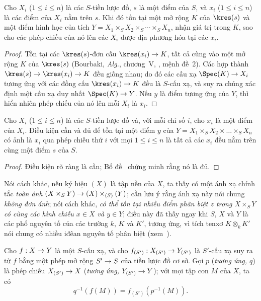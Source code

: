 \documentclass[oneside]{amsart}
\makeatletter
\renewcommand{\leq}{\leqslant}
\newcommand{\ega@arrow}[2]{\mathchoice{#1}{#2}{#2}{#2}}
\renewcommand{\to}{\ega@arrow{\longrightarrow}{\rightarrow}}
\let\EGAOriginalLabel\label
\renewcommand{\label}[1]{\phantomsection\EGAOriginalLabel{#1}}
\makeatother
\begin{document}
\begin{lemma}[3.4.6]
\label{I.3.4.6}
Cho $X_i$ ($1\leq i\leq n$) là các $S$-tiền lược đồ, $s$ là một điểm của
$S$, và $x_i$ ($1\leq i\leq n$) là các điểm của $X_i$ nằm trên $s$. Khi đó
tồn tại một mở rộng $K$ của $\kres(s)$ và một điểm hình học của tích
$Y=X_1\times_S X_2\times_S\cdots\times_S X_n$, nhận giá trị trong $K$, sao
cho các phép chiếu của nó lên các $X_i$ được địa phương hóa tại các $x_i$.
\end{lemma}

\begin{proof}
Tồn tại các $\kres(s)$-đơn cấu $\kres(x_i)\to K$, tất cả cùng vào một mở
rộng $K$ của $\kres(s)$ (Bourbaki, \emph{Alg.}, chương~V, ,
mệnh đề~2). Các hợp thành $\kres(s)\to\kres(x_i)\to K$ đều giống nhau; do
đó các cấu xạ $\Spec(K)\to X_i$ tương ứng với các đồng cấu
$\kres(x_i)\to K$ đều là $S$-cấu xạ, và suy ra chúng xác định một cấu xạ duy
nhất $\Spec(K)\to Y$. Nếu $y$ là điểm tương ứng của $Y$, thì hiển nhiên phép
chiếu của nó lên mỗi $X_i$ là $x_i$.
\end{proof}

\begin{proposition}[3.4.7]
\label{I.3.4.7}
Cho $X_i$ ($1\leq i\leq n$) là các $S$-tiền lược đồ và, với mỗi chỉ số $i$,
cho $x_i$ là một điểm của $X_i$. Điều kiện cần và đủ để tồn tại một điểm $y$
của $Y=X_1\times_S X_2\times\ldots\times_S X_n$ có ảnh là $x_i$ qua phép
chiếu thứ $i$ với mọi $1\leq i\leq n$ là tất cả các $x_i$ đều nằm trên cùng
một điểm $s$ của $S$.
\end{proposition}

\begin{proof}
Điều kiện rõ ràng là cần; Bổ đề~ chứng minh rằng nó là đủ.
\end{proof}

Nói cách khác, nếu ký hiệu $(X)$ là tập nền của $X$, ta thấy có một ánh xạ
chính tắc \emph{toàn ánh} $(X\times_S Y)\to(X)\times_{(S)}(Y)$; cần lưu ý
rằng ánh xạ này nói chung \emph{không đơn ánh}; nói cách khác, \emph{có thể
tồn tại nhiều điểm phân biệt $z$ trong $X\times_S Y$ có cùng các hình chiếu
$x\in X$ và $y\in Y$}; điều này đã thấy ngay khi $S$, $X$ và $Y$ là các phổ
nguyên tố của các trường $k$, $K$ và $K'$, tương ứng, vì tích tenxơ
$K\otimes_k K'$ nói chung có nhiều iđêan nguyên tố phân biệt
(xem~).

\begin{corollary}[3.4.8]
\label{I.3.4.8}
Cho $f:X\to Y$ là một $S$-cấu xạ, và cho
$f_{(S')}:X_{(S')}\to Y_{(S')}$ là $S'$-cấu xạ suy ra từ $f$ bằng một phép
mở rộng $S'\to S$ của tiền lược đồ cơ sở. Gọi $p$ (\emph{tương ứng, $q$}) là
phép chiếu $X_{(S')}\to X$ (\emph{tương ứng, $Y_{(S')}\to Y$}); với mọi tập
con $M$ của $X$, ta có
\[
  q^{-1}(f(M))=f_{(S')}(p^{-1}(M)).
\]
\end{corollary}
\end{document}
